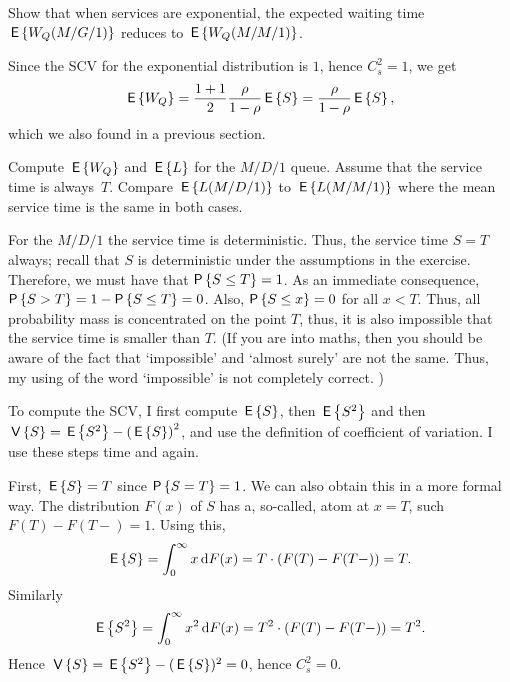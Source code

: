 \begin{exercise}
  Show that when services are exponential, the expected waiting time
  $\,\mathsf{E}\left\{W_Q(M/G/1)\right\}$ reduces to $\,\mathsf{E}\left\{W_Q(M/M/1)\right\}$.
    \begin{solution}
      Since the SCV for the exponential distribution is $1$, hence
      $C_s^2=1$, we get 
    \begin{equation*}
\,\mathsf{E}\left\{W_Q\right\} = \frac{1+1}2\frac{\rho}{1-\rho} \,\mathsf{E}\left\{S\right\} = \frac{\rho}{1-\rho} \,\mathsf{E}\left\{S\right\},
    \end{equation*}
which we also found in a previous section.
    \end{solution}
\end{exercise}


\begin{exercise}
  Compute $\,\mathsf{E}\left\{W_Q\right\}$ and $\,\mathsf{E}\left\{L\right\}$ for the $M/D/1$ queue. Assume that the
  service time is always~$T$. Compare $\,\mathsf{E}\left\{L(M/D/1)\right\}$ to $\,\mathsf{E}\left\{L(M/M/1)\right\}$
  where the mean service time is the same in both cases.
\begin{solution}
  For the $M/D/1$ the service time is deterministic. Thus, the service time $S=T$ always; recall that $S$ is   deterministic under the assumptions in the exercise. Therefore, we
  must have that $\P{S\leq T} = 1$. As an immediate consequence,
  $\P{S>T} = 1-\P{S\leq T} = 0$. Also, $\P{S \leq x} = 0$ for all
  $x<T$. Thus, all probability mass is concentrated on the point $T$,
  thus, it is also impossible that the service time is smaller than
  $T$.  (If you are into maths, then you should be aware of the fact
  that `impossible' and `almost surely' are not the same. Thus, my
  using of the word `impossible' is not completely correct. )

  To compute the SCV, I first compute $\,\mathsf{E}\left\{S\right\}$, then $\,\mathsf{E}\left\{S^2\right\}$ and then
  $\,\mathsf{V}\left\{S\right\} = \,\mathsf{E}\left\{S^2\right\} - \left(\,\mathsf{E}\left\{S\right\}\right)^2$, and use the definition of
  coefficient of variation. I use these steps time and again.

  First, $\,\mathsf{E}\left\{S\right\} = T$ since $\P{S=T} =1$. We can also obtain this in a
  more formal way. The distribution $F(x)$ of $S$ has a, so-called, atom at
  $x=T$, such $F(T) - F(T-) =1$.  Using this,
  \begin{equation*}
    \,\mathsf{E}\left\{S\right\} = \int_0^\infty x \,\text{d}F(x) = T\cdot (F(T)-F(T-)) = T.
  \end{equation*}
Similarly
\begin{equation*}
\,\mathsf{E}\left\{S^2\right\} = \int_0^\infty x^2 \,\text{d}F(x) = T^2\cdot (F(T)-F(T-)) = T^2.
\end{equation*}
Hence $\,\mathsf{V}\left\{S\right\} = \,\mathsf{E}\left\{S^2\right\} - (\,\mathsf{E}\left\{S\right\})^2 = 0$, hence $C_s^2 = 0$.


\end{solution}
\end{exercise}
